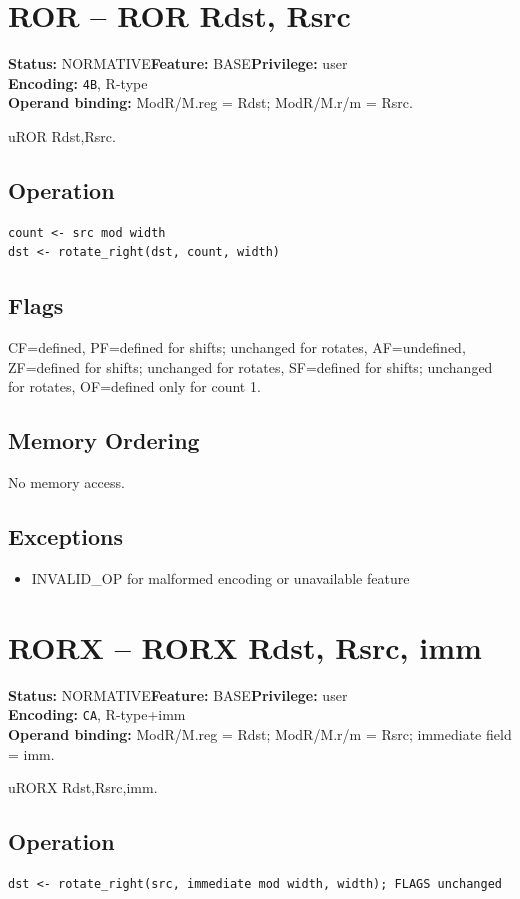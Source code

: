 \documentclass[10pt]{article}
\begin{document}
\section{ROR -- ROR Rdst, Rsrc}
\textbf{Status:} NORMATIVE\quad \textbf{Feature:} BASE\quad \textbf{Privilege:} user\\
\textbf{Encoding:} \texttt{4B}, R-type\\
\textbf{Operand binding:} ModR/M.reg = Rdst; ModR/M.r/m = Rsrc.

uROR Rdst,Rsrc.

\subsection*{Operation}
\begin{lstlisting}
count <- src mod width
dst <- rotate_right(dst, count, width)
\end{lstlisting}
\subsection*{Flags}
CF=defined, PF=defined for shifts; unchanged for rotates, AF=undefined, ZF=defined for shifts; unchanged for rotates, SF=defined for shifts; unchanged for rotates, OF=defined only for count 1.
\subsection*{Memory Ordering}
No memory access.
\subsection*{Exceptions}
\begin{itemize}
\item INVALID\_OP for malformed encoding or unavailable feature
\end{itemize}
\clearpage

\section{RORX -- RORX Rdst, Rsrc, imm}
\textbf{Status:} NORMATIVE\quad \textbf{Feature:} BASE\quad \textbf{Privilege:} user\\
\textbf{Encoding:} \texttt{CA}, R-type+imm\\
\textbf{Operand binding:} ModR/M.reg = Rdst; ModR/M.r/m = Rsrc; immediate field = imm.

uRORX Rdst,Rsrc,imm.

\subsection*{Operation}
\begin{lstlisting}
dst <- rotate_right(src, immediate mod width, width); FLAGS unchanged
\end{lstlisting}
\end{document}
